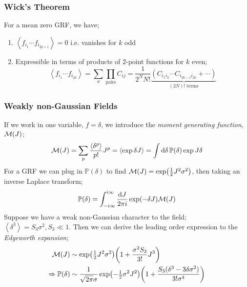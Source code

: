 \subsubsection{Wick's Theorem}
For a mean zero GRF, we have;
\begin{enumerate}
\item $\left< f_{i_1}\cdots f_{i_{2p + 1}} \right> = 0$ i.e. vanishes for $k$ odd
\item Expressible in terms of products of $2$-point functions for $k$ even;
\begin{equation}
\left< f_{i_1}\cdots f_{i_{2k}} \right> = \sum_{\sigma}{\prod_{\text{pairs}}{C_{ij}}} = \frac{1}{2^N N!}\underbrace{\left(C_{i_1 i_2}\cdots C_{i_{2k - 1}i_{2k}} + \cdots\right)}_{(2N)! \,\,\text{terms}}
\end{equation}
\end{enumerate}
\subsubsection{Weakly non-Gaussian Fields}
If we work in one variable, $f = \delta$, we introduce the \emph{moment generating function}, $\mathcal{M}(J)$;
\begin{equation}
\mM(J) = \sum_{p}{\frac{\left< \delta^p \right>}{p!}J^p} = \left< \exp \delta J \right> = \int{\upd{\delta} \mathbb{P}(\delta)\exp J\delta}
\end{equation}
For a GRF we can plug in $\mathbb{P}(\delta)$ to find $\mM(J) = \exp\left(\tfrac{1}{2}J^2 \sigma^2\right)$, then taking an inverse Laplace transform;
\begin{equation}
\mathbb{P}(\delta) = \int_{-i\infty}^{i\infty}{\frac{\text{d} J}{2\pi i} \exp(-\delta J)\mathcal{M}(J)}
\end{equation}
Suppose we have a weak non-Gaussian character to the field; $\left< \delta^3 \right> = S_3 \sigma^2, S_3 \ll 1$. Then we can derive the leading order expression to the \emph{Edgeworth expansion};
\begin{align}
\mM(J) &\sim \exp(\tfrac{1}{2}J^2 \sigma^2)\left(1 + \frac{\sigma^2 S_3}{3!}J^3\right) \\
\Rightarrow \mathbb{P}(\delta) &\sim \frac{1}{\sqrt{2\pi}\sigma}\exp\left(-\tfrac{1}{2}\sigma^2 J^2\right)\left(1 + \frac{S_3 (\delta^3 - 3\delta \sigma^2)}{3!\sigma^4}\right)
\end{align}
